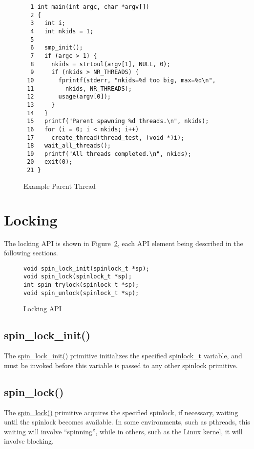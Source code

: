 \begin{figure}[htbp]
{ \scriptsize
\begin{verbatim}
  1 int main(int argc, char *argv[])
  2 {
  3   int i;
  4   int nkids = 1;
  5
  6   smp_init();
  7   if (argc > 1) {
  8     nkids = strtoul(argv[1], NULL, 0);
  9     if (nkids > NR_THREADS) {
 10       fprintf(stderr, "nkids=%d too big, max=%d\n",
 11         nkids, NR_THREADS);
 12       usage(argv[0]);
 13     }
 14   }
 15   printf("Parent spawning %d threads.\n", nkids);
 16   for (i = 0; i < nkids; i++)
 17     create_thread(thread_test, (void *)i);
 18   wait_all_threads();
 19   printf("All threads completed.\n", nkids);
 20   exit(0);
 21 }
\end{verbatim}
}
\caption{Example Parent Thread}
\label{fig:intro:Example Parent Thread}
\end{figure}

\section{Locking}
\label{app:primitives:Locking}

The locking API is shown in
Figure~\ref{fig:intro:Locking API},
each API element being described in the following sections.

\begin{figure}[htbp]
{ \scriptsize
\begin{verbatim}
void spin_lock_init(spinlock_t *sp);
void spin_lock(spinlock_t *sp);
int spin_trylock(spinlock_t *sp);
void spin_unlock(spinlock_t *sp);
\end{verbatim}
}
\caption{Locking API}
\label{fig:intro:Locking API}
\end{figure}

\subsection{spin\_lock\_init()}

The \url{spin_lock_init()} primitive initializes the specified
\url{spinlock_t} variable, and must be invoked before
this variable is passed to any other spinlock primitive.

\subsection{spin\_lock()}

The \url{spin_lock()} primitive acquires the specified spinlock,
if necessary, waiting until the spinlock becomes available.
In some environments, such as pthreads, this waiting will involve
``spinning'', while
in others, such as the Linux kernel, it will involve blocking.

